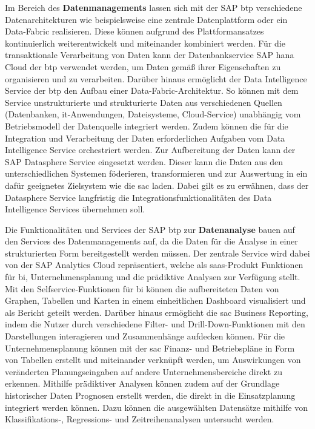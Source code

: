 Im Bereich des \textbf{Datenmanagements} lassen sich mit der SAP \ac{btp} verschiedene Datenarchitekturen wie beispielsweise eine zentrale Datenplattform oder ein Data-Fabric realisieren. Diese können aufgrund des Plattformansatzes kontinuierlich weiterentwickelt und miteinander kombiniert werden. Für die transaktionale Verarbeitung von Daten kann der Datenbankservice SAP \ac{hana} Cloud der \ac{btp} verwendet werden, um Daten gemäß ihrer Eigenschaften zu organisieren und zu verarbeiten. Darüber hinaus ermöglicht der Data Intelligence Service der \ac{btp} den Aufbau einer Data-Fabric-Architektur. \autocite[Vgl.][S. 64-66]{SEUBERT} So können mit dem Service unstrukturierte und strukturierte Daten aus verschiedenen Quellen (Datenbanken, \ac{it}-Anwendungen, Dateisysteme, Cloud-Service) unabhängig vom Betriebsmodell der Datenquelle integriert werden. Zudem können die für die Integration und Verarbeitung der Daten erforderlichen Aufgaben vom Data Intelligence Service orchestriert werden. \autocite[Vgl.][]{DATAINTELLIGENCE} Zur Aufbereitung der Daten kann der SAP Datasphere Service eingesetzt werden. Dieser kann die Daten aus den unterschiedlichen Systemen föderieren, transformieren und zur Auswertung in ein dafür geeignetes Zielsystem wie die \ac{sac} laden. \autocite[Vgl.][S. 3]{FSDDATASPHERE}  Dabei gilt es zu erwähnen, dass der Datasphere Service langfristig die Integrationsfunktionalitäten des Data Intelligence Services übernehmen soll. \autocite[Vgl.][]{QUIRK2023}

\newpage

Die Funktionalitäten und Services der SAP \ac{btp} zur \textbf{Datenanalyse} bauen auf den Services des Datenmanagements auf, da die Daten für die Analyse in einer strukturierten Form bereitgestellt werden müssen. Der zentrale Service wird dabei von der SAP Analytics Cloud repräsentiert, welche als \ac{saas}-Produkt Funktionen für \ac{bi}, Unternehmensplanung und die prädiktive Analysen zur Verfügung stellt. Mit den Selfservice-Funktionen für \ac{bi} können die aufbereiteten Daten von Graphen, Tabellen und Karten in einem einheitlichen Dashboard visualisiert und als Bericht geteilt werden. Darüber hinaus ermöglicht die \ac{sac} Business Reporting, indem die Nutzer durch verschiedene Filter- und Drill-Down-Funktionen mit den Darstellungen interagieren und Zusammenhänge aufdecken können. Für die Unternehmensplanung können mit der \ac{sac} Finanz- und Betriebspläne in Form von Tabellen erstellt und miteinander verknüpft werden, um Auswirkungen von veränderten Planungseingaben auf andere Unternehmensbereiche direkt zu erkennen. Mithilfe prädiktiver Analysen können zudem auf der Grundlage historischer Daten Prognosen erstellt werden, die direkt in die Einsatzplanung integriert werden können. \autocite[Vgl.][S. 64-67]{SEUBERT} Dazu können die ausgewählten Datensätze mithilfe von Klassifikations-, Regressions- und Zeitreihenanalysen untersucht werden. \autocite[Vgl.][]{FSDSAC2023}

